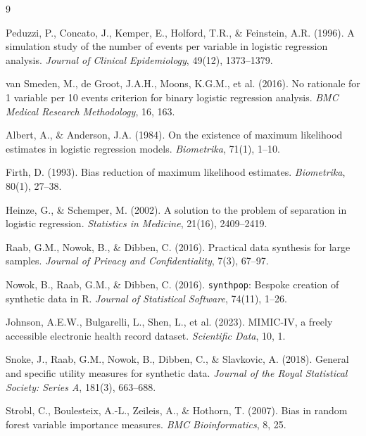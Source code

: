 \documentclass[11pt]{article}
\begin{document}
{\footnotesize
\setlength{\bibsep}{0pt plus 0.3ex}
\begin{thebibliography}{9}
\setlength{\itemsep}{0pt}
\setlength{\parskip}{0pt}

Peduzzi, P., Concato, J., Kemper, E., Holford, T.R., \& Feinstein, A.R. (1996).
A simulation study of the number of events per variable in logistic
regression analysis.
\textit{Journal of Clinical Epidemiology}, 49(12), 1373--1379.

van Smeden, M., de Groot, J.A.H., Moons, K.G.M., et al. (2016).
No rationale for 1 variable per 10 events criterion for binary logistic
regression analysis.
\textit{BMC Medical Research Methodology}, 16, 163.

Albert, A., \& Anderson, J.A. (1984).
On the existence of maximum likelihood estimates in logistic regression
models.
\textit{Biometrika}, 71(1), 1--10.

Firth, D. (1993).
Bias reduction of maximum likelihood estimates.
\textit{Biometrika}, 80(1), 27--38.

Heinze, G., \& Schemper, M. (2002).
A solution to the problem of separation in logistic regression.
\textit{Statistics in Medicine}, 21(16), 2409--2419.

Raab, G.M., Nowok, B., \& Dibben, C. (2016).
Practical data synthesis for large samples.
\textit{Journal of Privacy and Confidentiality}, 7(3), 67--97.

Nowok, B., Raab, G.M., \& Dibben, C. (2016).
\texttt{synthpop}: Bespoke creation of synthetic data in R.
\textit{Journal of Statistical Software}, 74(11), 1--26.

Johnson, A.E.W., Bulgarelli, L., Shen, L., et al. (2023).
MIMIC-IV, a freely accessible electronic health record dataset.
\textit{Scientific Data}, 10, 1.

Snoke, J., Raab, G.M., Nowok, B., Dibben, C., \& Slavkovic, A. (2018).
General and specific utility measures for synthetic data.
\textit{Journal of the Royal Statistical Society: Series A}, 181(3), 663--688.

Strobl, C., Boulesteix, A.-L., Zeileis, A., \& Hothorn, T. (2007).
Bias in random forest variable importance measures.
\textit{BMC Bioinformatics}, 8, 25.

\end{thebibliography}
}
\end{document}
